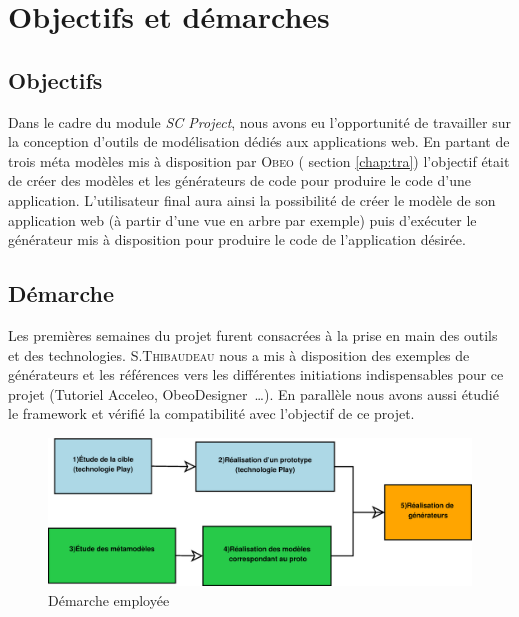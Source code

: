 \chapter{Objectifs et démarches}\label{chap:mod}


\section{Objectifs}
Dans le cadre du module \emph{SC Project}, nous avons eu l'opportunité de travailler sur la conception d'outils de modélisation dédiés aux applications web. En partant de trois méta modèles mis à disposition par \textsc{Obeo}
(\cf{} section \ref{chap:tra}) l'objectif était de créer des modèles et les générateurs de code pour produire le code d'une application. L'utilisateur final aura ainsi la possibilité de créer le modèle de son application web (à partir d'une vue en arbre par exemple) puis d'exécuter le générateur mis à disposition pour produire le code de l'application désirée.


\section{Démarche} 
Les premières semaines du projet furent consacrées à la prise en main des outils et des technologies. S.\textsc{Thibaudeau} nous a mis à disposition des exemples de générateurs et les références vers les différentes initiations indispensables pour ce projet (Tutoriel Acceleo, ObeoDesigner~\dots). En parallèle nous avons aussi étudié le framework \kwplay{} et vérifié la compatibilité avec l'objectif de ce projet.

\begin{figure}[htb]
  \includegraphics[scale=.35]{img/demarche.eps}
  \caption{Démarche employée}
  \label{fig:dem}
\end{figure}

